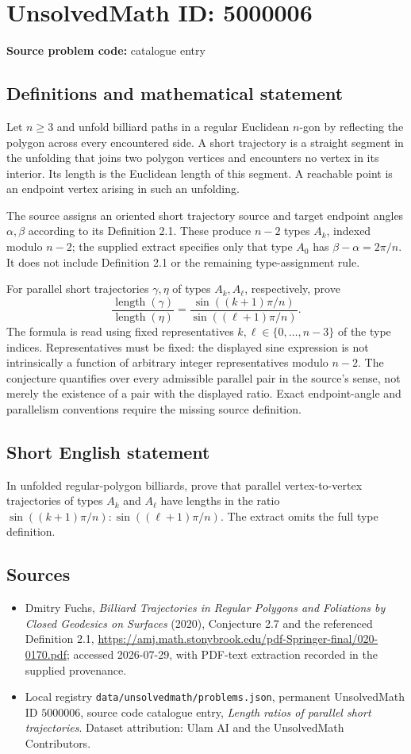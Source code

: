 \documentclass[11pt]{article}
\begin{document}
\section*{UnsolvedMath ID: 5000006}
\textbf{Source problem code:} catalogue entry
\subsection{Definitions and mathematical statement}
Let $n\geq3$ and unfold billiard paths in a regular Euclidean $n$-gon by reflecting the polygon across every encountered side. A short trajectory is a straight segment in the unfolding that joins two polygon vertices and encounters no vertex in its interior. Its length is the Euclidean length of this segment. A reachable point is an endpoint vertex arising in such an unfolding.

The source assigns an oriented short trajectory source and target endpoint angles $\alpha,\beta$ according to its Definition 2.1. These produce $n-2$ types $A_k$, indexed modulo $n-2$; the supplied extract specifies only that type $A_0$ has $\beta-\alpha=2\pi/n$. It does not include Definition 2.1 or the remaining type-assignment rule.

For parallel short trajectories $\gamma,\eta$ of types $A_k,A_\ell$, respectively, prove
\[
\frac{\operatorname{length}(\gamma)}{\operatorname{length}(\eta)}
=\frac{\sin((k+1)\pi/n)}{\sin((\ell+1)\pi/n)}.
\]
The formula is read using fixed representatives $k,\ell\in\{0,\ldots,n-3\}$ of the type indices. Representatives must be fixed: the displayed sine expression is not intrinsically a function of arbitrary integer representatives modulo $n-2$. The conjecture quantifies over every admissible parallel pair in the source's sense, not merely the existence of a pair with the displayed ratio. Exact endpoint-angle and parallelism conventions require the missing source definition.
\subsection{Short English statement}
In unfolded regular-polygon billiards, prove that parallel vertex-to-vertex trajectories of types $A_k$ and $A_\ell$ have lengths in the ratio $\sin((k+1)\pi/n):\sin((\ell+1)\pi/n)$. The extract omits the full type definition.
\subsection{Sources}
\begin{itemize}
\item Dmitry Fuchs, \emph{Billiard Trajectories in Regular Polygons and Foliations by Closed Geodesics on Surfaces} (2020), Conjecture 2.7 and the referenced Definition 2.1, \url{https://amj.math.stonybrook.edu/pdf-Springer-final/020-0170.pdf}; accessed 2026-07-29, with PDF-text extraction recorded in the supplied provenance.
\item Local registry \texttt{data/unsolvedmath/problems.json}, permanent UnsolvedMath ID $5000006$, source code catalogue entry, \emph{Length ratios of parallel short trajectories}. Dataset attribution: Ulam AI and the UnsolvedMath Contributors.
\end{itemize}
\end{document}
